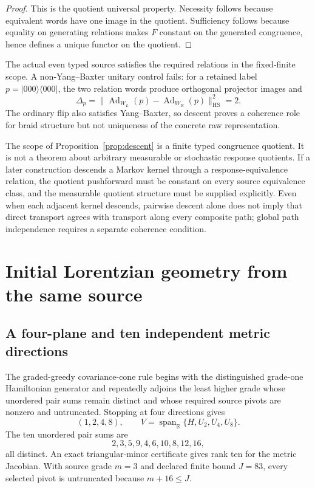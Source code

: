 \documentclass[11pt]{article}
\theoremstyle{definition}
\theoremstyle{remark}
\newcommand{\Span}{\operatorname{span}}
\begin{document}
\begin{proof}
This is the quotient universal property. Necessity follows because equivalent words have one image in the quotient. Sufficiency follows because equality on generating relations makes $F$ constant on the generated congruence, hence defines a unique functor on the quotient.
\end{proof}

The actual even typed source satisfies the required relations in the fixed-finite scope. A non-Yang--Baxter unitary control fails: for a retained label $p=|000\rangle\langle000|$, the two relation words produce orthogonal projector images and
\begin{equation}
  \Delta_p=\|\operatorname{Ad}_{W_L}(p)-\operatorname{Ad}_{W_R}(p)\|_{\mathrm{HS}}^2=2.
\end{equation}
The ordinary flip also satisfies Yang--Baxter, so descent proves a coherence role for braid structure but not uniqueness of the concrete raw representation.

The scope of Proposition~\ref{prop:descent} is a finite typed congruence quotient. It is not a theorem about arbitrary measurable or stochastic response quotients. If a later construction descends a Markov kernel through a response-equivalence relation, the quotient pushforward must be constant on every source equivalence class, and the measurable quotient structure must be supplied explicitly. Even when each adjacent kernel descends, pairwise descent alone does not imply that direct transport agrees with transport along every composite path; global path independence requires a separate coherence condition.

\section{Initial Lorentzian geometry from the same source}

\subsection{A four-plane and ten independent metric directions}

The graded-greedy covariance-cone rule begins with the distinguished grade-one Hamiltonian generator and repeatedly adjoins the least higher grade whose unordered pair sums remain distinct and whose required source pivots are nonzero and untruncated. Stopping at four directions gives
\begin{equation}
  (1,2,4,8),\qquad
  V=\Span_{\mathbb{R}}\{H,U_2,U_4,U_8\}.
\end{equation}
The ten unordered pair sums are
\begin{equation}
  2,3,5,9,4,6,10,8,12,16,
\end{equation}
all distinct. An exact triangular-minor certificate gives rank ten for the metric Jacobian. With source grade $m=3$ and declared finite bound $J=83$, every selected pivot is untruncated because $m+16\le J$.
\end{document}
